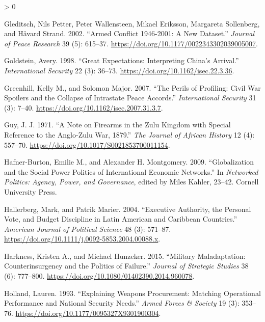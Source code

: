 \documentclass[
]{article}
\newlength{\cslhangindent}
\newenvironment{CSLReferences}[2] %
 {%
  \setlength{\parindent}{0pt}
  \ifodd #1 \everypar{\setlength{\hangindent}{\cslhangindent}}\ignorespaces\fi
  \ifnum #2 > 0
  \setlength{\parskip}{#2\baselineskip}
  \fi
 }%
 {}
\begin{document}
\begin{CSLReferences}{1}{0}
\leavevmode\hypertarget{ref-gleditsch_armedconflict19462001_2002}{}%
Gleditsch, Nils Petter, Peter Wallensteen, Mikael Eriksson, Margareta Sollenberg, and Håvard Strand. 2002. {``Armed {Conflict} 1946-2001: {A New Dataset}.''} \emph{Journal of Peace Research} 39 (5): 615--37. \url{https://doi.org/10.1177/0022343302039005007}.

\leavevmode\hypertarget{ref-goldstein_greatexpectationsinterpreting_1998}{}%
Goldstein, Avery. 1998. {``Great {Expectations}: {Interpreting China}'s {Arrival}.''} \emph{International Security} 22 (3): 36--73. \url{https://doi.org/10.1162/isec.22.3.36}.

\leavevmode\hypertarget{ref-greenhill_perilsprofilingcivil_2007}{}%
Greenhill, Kelly M., and Solomon Major. 2007. {``The {Perils} of {Profiling}: {Civil War Spoilers} and the {Collapse} of {Intrastate Peace Accords}.''} \emph{International Security} 31 (3): 7--40. \url{https://doi.org/10.1162/isec.2007.31.3.7}.

\leavevmode\hypertarget{ref-guy_notefirearmszulu_1971}{}%
Guy, J. J. 1971. {``A {Note} on {Firearms} in the {Zulu Kingdom} with Special Reference to the {Anglo}-{Zulu War}, 1879.''} \emph{The Journal of African History} 12 (4): 557--70. \url{https://doi.org/10.1017/S0021853700011154}.

\leavevmode\hypertarget{ref-hafner-burton_globalizationsocialpower_2009}{}%
Hafner-Burton, Emilie M., and Alexander H. Montgomery. 2009. {``Globalization and the {Social Power Politics} of {International Economic Networks}.''} In \emph{Networked {Politics}: {Agency}, {Power}, and {Governance}}, edited by Miles Kahler, 23--42. {Cornell University Press}.

\leavevmode\hypertarget{ref-hallerberg_executiveauthoritypersonal_2004}{}%
Hallerberg, Mark, and Patrik Marier. 2004. {``Executive {Authority}, the {Personal Vote}, and {Budget Discipline} in {Latin American} and {Caribbean Countries}.''} \emph{American Journal of Political Science} 48 (3): 571--87. \url{https://doi.org/10.1111/j.0092-5853.2004.00088.x}.

\leavevmode\hypertarget{ref-harkness_militarymaladaptationcounterinsurgency_2015}{}%
Harkness, Kristen A., and Michael Hunzeker. 2015. {``Military {Maladaptation}: {Counterinsurgency} and the {Politics} of {Failure}.''} \emph{Journal of Strategic Studies} 38 (6): 777--800. \url{https://doi.org/10.1080/01402390.2014.960078}.

\leavevmode\hypertarget{ref-holland_explainingweaponsprocurement_1993}{}%
Holland, Lauren. 1993. {``Explaining {Weapons Procurement}: {Matching Operational Performance} and {National Security Needs}.''} \emph{Armed Forces \& Society} 19 (3): 353--76. \url{https://doi.org/10.1177/0095327X9301900304}.


\end{CSLReferences}
\end{document}
